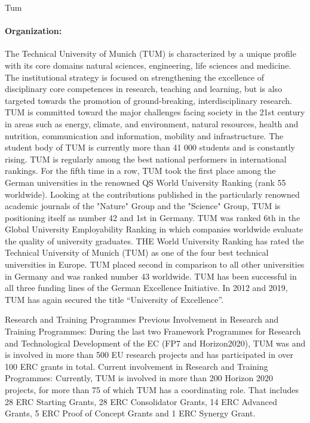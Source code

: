 \begin{sitedescription}{Tum}

\paragraph{Organization:}

The Technical University of Munich (TUM) is characterized by a unique profile with its core domains natural sciences, engineering, life sciences and medicine. The institutional strategy is focused on strengthening the excellence of disciplinary core competences in research, teaching and learning, but is also targeted towards the promotion of ground-breaking, interdisciplinary research. TUM is committed toward the major challenges facing society in the 21st century in areas such as energy, climate, and environment, natural resources, health and nutrition, communication and information, mobility and infrastructure.
The student body of TUM is currently more than 41 000 students and is constantly rising. TUM is regularly among the best national performers in international rankings. For the fifth time in a row, TUM took the first place among the German universities in the renowned QS World University Ranking (rank 55 worldwide). Looking at the contributions published in the particularly renowned academic journals of the "Nature" Group and the "Science" Group, TUM is positioning itself as number 42 and 1st in Germany. TUM was ranked 6th in the Global University Employability Ranking in which companies worldwide evaluate the quality of university graduates. THE World University Ranking has rated the Technical University of Munich (TUM) as one of the four best technical universities in Europe. TUM placed second in comparison to all other universities in Germany and was ranked number 43 worldwide. 
TUM has been successful in all three funding lines of the German Excellence Initiative. In 2012 and 2019, TUM has again secured the title ``University of Excellence''.

Research and Training Programmes
Previous Involvement in Research and Training Programmes:
During the last two Framework Programmes for Research and Technological Development of the EC (FP7 and Horizon2020), TUM was and is involved in more than 500 EU research projects and has participated in over 100 ERC grants in total.
Current involvement in Research and Training Programmes: 
Currently, TUM is involved in more than 200 Horizon 2020 projects, for more than 75 of which TUM has a coordinating role. That includes 28 ERC Starting Grants, 28 ERC Consolidator Grants, 14 ERC Advanced Grants, 5 ERC Proof of Concept Grants and 1 ERC Synergy Grant.



\end{sitedescription}
